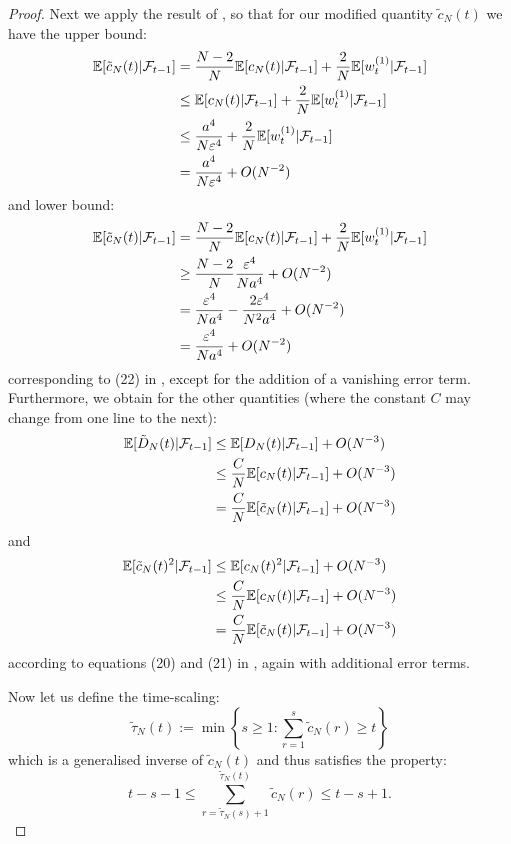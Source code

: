 \documentclass[fleqn]{article}
\theoremstyle{definition}
\newcommand{\E}{\mathbb{E}}
\newcommand{\F}{\mathcal{F}_{t-1}}
\newcommand{\wt}[2][t]{w_{#1}^{(#2)}}
\begin{document}
\begin{proof}
Next we apply the result of \citet[Lemma 3]{koskela2018}, so that for our modified quantity $\tilde{c}_N(t)$ we have the upper bound:
\begin{align}\label{eq:cN_upper}
\E[\tilde{c}_N(t) |\F] &= \frac{N-2}{N} \E[c_N(t) |\F] + \frac{2}{N} \E[\wt{1} |\F] \notag\\
& \leq \E[c_N(t) |\F] + \frac{2}{N} \E[\wt{1} |\F] \notag\\
&\leq \frac{a^4}{N\varepsilon^4} +  \frac{2}{N} \E[\wt{1} |\F] \notag\\
&= \frac{a^4}{N\varepsilon^4} + O(N^{-2})
\end{align}
and lower bound:
\begin{align}\label{eq:cN_lower}
\E[\tilde{c}_N(t) |\F] &= \frac{N-2}{N} \E[c_N(t) |\F] + \frac{2}{N} \E[\wt{1} |\F] \notag\\
& \geq  \frac{N-2}{N}\frac{\varepsilon^4}{Na^4} + O(N^{-2}) \notag\\
& = \frac{\varepsilon^4}{Na^4} - \frac{2\varepsilon^4}{N^2a^4} + O(N^{-2}) \notag\\
& = \frac{\varepsilon^4}{Na^4} + O(N^{-2})
\end{align}
corresponding to (22) in \citet{koskela2018}, except for the addition of a vanishing error term.
Furthermore, we obtain for the other quantities (where the constant $C$ may change from one line to the next):
\begin{align}\label{eq:DN_upper}
\E[\tilde{D}_N(t) |\F] &\leq \E[D_N(t) |\F] + O(N^{-3}) \notag\\
&\leq \frac{C}{N} \E[c_N(t) |\F] + O(N^{-3}) \notag\\
&= \frac{C}{N} \E[\tilde{c}_N(t) |\F] + O(N^{-3})
\end{align}
and
\begin{align}\label{eq:cN2_upper}
\E[\tilde{c}_N(t)^2 |\F] &\leq \E[c_N(t)^2 |\F] + O(N^{-3}) \notag\\
&\leq \frac{C}{N} \E[c_N(t) |\F] + O(N^{-3}) \notag\\
&= \frac{C}{N} \E[\tilde{c}_N(t) |\F] + O(N^{-3})
\end{align}
according to equations (20) and (21) in \citet{koskela2018}, again with additional error terms.

Now let us define the time-scaling:
\begin{equation*}
\tilde{\tau}_N(t) := \min\left\{ s\geq 1 : \sum_{r=1}^s \tilde{c}_N(r) \geq t \right\}
\end{equation*}
which is a generalised inverse of $\tilde{c}_N(t)$ and thus satisfies the property:
\begin{equation}\label{eq:sum_tau_cN_upperlower}
t-s-1 \leq \sum_{r=\tilde{\tau}_N(s)+1}^{\tilde{\tau}_N(t)} \tilde{c}_N(r) \leq t-s +1 .
\end{equation}


\end{proof}
\end{document}
